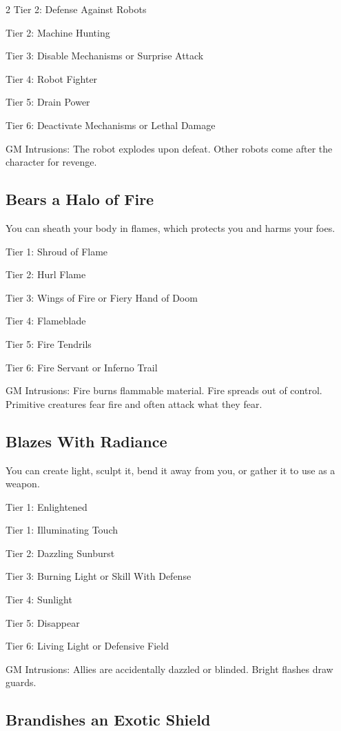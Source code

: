 \begin{multicols}{2}
Tier 2: Defense Against Robots

Tier 2: Machine Hunting

Tier 3: Disable Mechanisms or Surprise Attack

Tier 4: Robot Fighter

Tier 5: Drain Power

Tier 6: Deactivate Mechanisms or Lethal Damage

GM Intrusions: The robot explodes upon defeat. Other robots come after the character for revenge.

\subsection{Bears a Halo of Fire}

You can sheath your body in flames, which protects you and harms your foes.

Tier 1: Shroud of Flame

Tier 2: Hurl Flame

Tier 3: Wings of Fire or Fiery Hand of Doom

Tier 4: Flameblade 

Tier 5: Fire Tendrils

Tier 6: Fire Servant or Inferno Trail 

GM Intrusions: Fire burns flammable material. Fire spreads out of control. Primitive creatures fear fire and often attack what they fear.

\subsection{Blazes With Radiance}

You can create light, sculpt it, bend it away from you, or gather it to use as a weapon.

Tier 1: Enlightened

Tier 1: Illuminating Touch

Tier 2: Dazzling Sunburst

Tier 3: Burning Light or Skill With Defense

Tier 4: Sunlight

Tier 5: Disappear

Tier 6: Living Light or Defensive Field

GM Intrusions: Allies are accidentally dazzled or blinded. Bright flashes draw guards.

\subsection{Brandishes an Exotic Shield}


\end{multicols}
